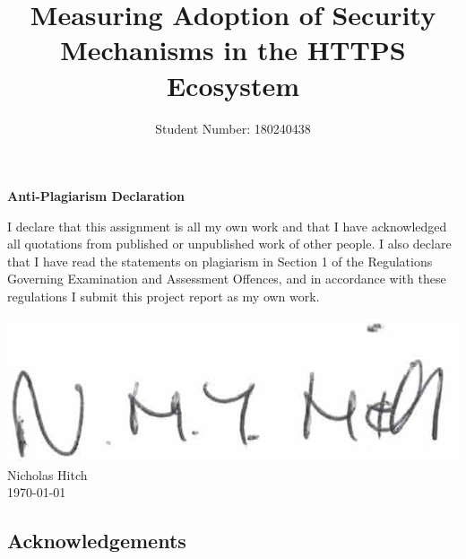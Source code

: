 \documentclass{mscreport}
\begin{document}

\author{Student Number: 180240438	}
\title{Measuring Adoption of Security Mechanisms in the HTTPS Ecosystem}

\maketitle

\begin{center}
    {\Large\bfseries Anti-Plagiarism Declaration}
    \vspace{1cm}
\begin{enumerate}

I declare that this assignment is all my own work and that I have acknowledged all quotations from published or unpublished work of other people.  I also declare that I have read the statements on plagiarism in Section 1 of the Regulations Governing Examination and Assessment Offences, and in accordance with these regulations I submit this project report as my own work.

\begin{flushleft}
\includegraphics[scale=1]{../images/signature_real.png} %
\newline
  \begingroup
    \noindent\textsf{Nicholas Hitch} \vspace{0.5cm}\\
    \noindent\textsf{\today}
  \endgroup
  \end{flushleft}

\end{enumerate}
\end{center}

\newpage

\begin{center}
\section*{Acknowledgements}
\end{center}
\end{document}
